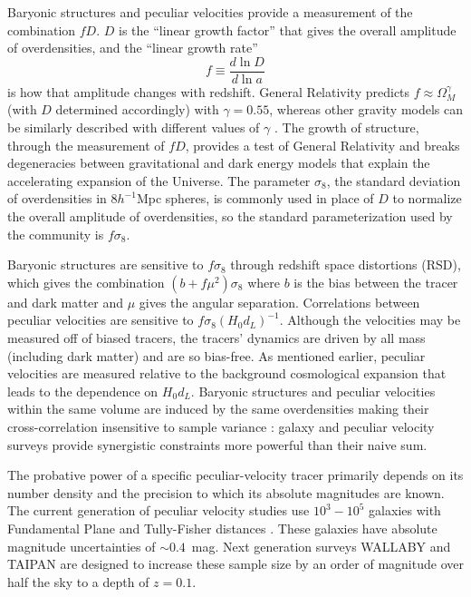 \documentclass{aastex62}   	%
\begin{document}
Baryonic structures and peculiar velocities  provide a measurement of the combination $fD$.  $D$ is the ``linear growth factor'' that
gives the overall amplitude of  overdensities, and the ``linear growth rate''
$$f \equiv \frac{d\ln{D}}{d\ln{a}}$$ is how that amplitude changes with redshift.  General Relativity predicts
$f \approx \Omega_M^\gamma$ (with $D$ determined accordingly) with $\gamma=0.55$, whereas other gravity models can be similarly described
with different values of $\gamma$
\citep{2007APh....28..481L}.  The growth of structure, through the measurement of $fD$, provides a test of General Relativity and breaks degeneracies
between gravitational and dark energy models that explain the accelerating expansion of the Universe.
The parameter $\sigma_8$, the  standard deviation of overdensities in 8$h^{-1}$Mpc spheres, is 
commonly used in place of $D$ to normalize the
overall amplitude of  overdensities, so the standard parameterization used by the community is $f\sigma_8$.

Baryonic structures are sensitive to $f\sigma_8$ through redshift space distortions (RSD), 
which gives the combination $(b + f \mu^2)\sigma_8$ where $b$ is the bias between the tracer and dark matter
and $\mu$ gives the angular separation.  Correlations between peculiar velocities are sensitive to  $f\sigma_8 (H_0 d_L)^{-1}$.
Although the velocities may be measured off of biased tracers, the tracers' dynamics are driven by all mass (including dark matter) and are so bias-free.
As
mentioned earlier, peculiar velocities are measured relative to the background cosmological expansion that
leads to the dependence on $H_0 d_L$. 
Baryonic structures and peculiar velocities within the same volume are induced by the same overdensities  making their cross-correlation 
insensitive to sample variance \citep{2007PhRvL..99h1301G}: galaxy and peculiar velocity surveys provide synergistic constraints more powerful
than their naive sum.

The probative power of a specific peculiar-velocity tracer primarily depends on its number density and the precision to which its absolute magnitudes are known.
The current generation of peculiar velocity studies use $10^3-10^5$ galaxies with Fundamental Plane and Tully-Fisher distances \citep{2008AJ....135.1738M, 2014MNRAS.445.2677S,
2016AJ....152...50T}.  These galaxies have absolute magnitude uncertainties of $\sim 0.4$~mag. 
Next generation surveys WALLABY \citep{2008ExA....22..151J} and TAIPAN \citep{2017PASA...34...47D} are designed to increase these sample size by an order of magnitude
over half the sky to a depth of $z=0.1$.
\end{document}
